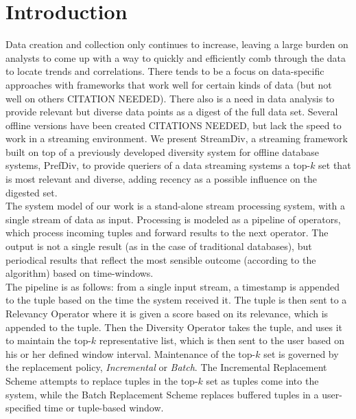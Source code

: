 \section{Introduction}

Data creation and collection only continues to increase, leaving a large burden on analysts to come up with a way to quickly and efficiently comb through the data to locate trends and correlations.  There tends to be a focus on data-specific approaches with frameworks that work well for certain kinds of data (but not well on others CITATION NEEDED).  There also is a need in data analysis to provide relevant but diverse data points as a digest of the full data set.  Several offline versions have been created \cite{Ge:2015:PD:2795218.2795224} CITATIONS NEEDED, but lack the speed to work in a streaming environment.  We present StreamDiv, a streaming framework built on top of a previously developed diversity system for offline database systems, PrefDiv\cite{Ge:2015:PD:2795218.2795224}, to provide queriers of a data streaming systems a top-$k$ set that is most relevant and diverse, adding recency as a possible influence on the digested set.\\
\indent The system model of our work is a stand-alone stream processing system, with a single stream of data as input. Processing is modeled as a pipeline of operators, which process incoming tuples and forward results to the next operator.  The output is not a single result (as in the case of traditional databases), but periodical results that reflect the most sensible outcome (according to the algorithm) based on time-windows.\\
\indent The pipeline is as follows: from a single input stream, a timestamp is appended to the tuple based on the time the system received it.  The tuple is then sent to a Relevancy Operator where it is given a score based on its relevance, which is appended to the tuple.  Then the Diversity Operator takes the tuple, and uses it to maintain the top-$k$ representative list, which is then sent to the user based on his or her defined window interval.  Maintenance of the top-$k$ set is governed by the replacement policy, \emph{Incremental} or \emph{Batch}.  The Incremental Replacement Scheme attempts to replace tuples in the top-$k$ set as tuples come into the system, while the Batch Replacement Scheme replaces buffered tuples in a user-specified time or tuple-based window.
